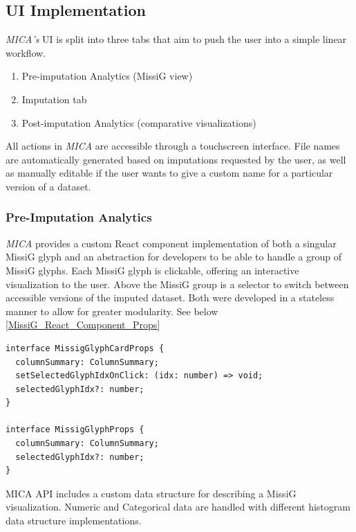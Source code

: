\documentclass[a4paper, 11pt]{article}
\newcommand{\mica}{\textit{MICA }}
\newcommand{\micas}{\textit{MICA's }}
\begin{document}
\subsection{UI Implementation}
\micas UI is split into three tabs that aim to push the user into a simple
linear workflow.
\begin{enumerate}
        \item Pre-imputation Analytics (MissiG view)
        \item Imputation tab
        \item Post-imputation Analytics (comparative visualizations) 
\end{enumerate}

All actions in \mica are accessible through a touchscreen interface. File names are
automatically generated based on imputations requested by the user, as well as
manually editable if the user wants to give a custom name for a particular
version of a dataset.

\subsubsection{Pre-Imputation Analytics}
\label{pre-imputations_analytics}
\mica provides a custom React component implementation of both a singular
MissiG glyph and an abstraction for developers to be able to handle a group of
MissiG glyphs. Each MissiG glyph is clickable, offering an interactive
visualization to the user. Above the MissiG group is a selector to switch
between accessible versions of the imputed dataset. Both were developed in a
stateless manner to allow for greater modularity. See below
\ref{MissiG_React_Component_Props}

\begin{program}[H]
\begin{verbatim}
interface MissigGlyphCardProps {
  columnSummary: ColumnSummary;
  setSelectedGlyphIdxOnClick: (idx: number) => void;
  selectedGlyphIdx?: number;
}

interface MissigGlyphProps {
  columnSummary: ColumnSummary;
  selectedGlyphIdx?: number;
}
\end{verbatim}
\caption{MissiG React Component Props}
\label{MissiG_React_Component_Props}
\end{program}

MICA API includes a custom data structure for describing a MissiG
visualization. Numeric and Categorical data are handled with different histogram
data structure implementations.
\end{document}
